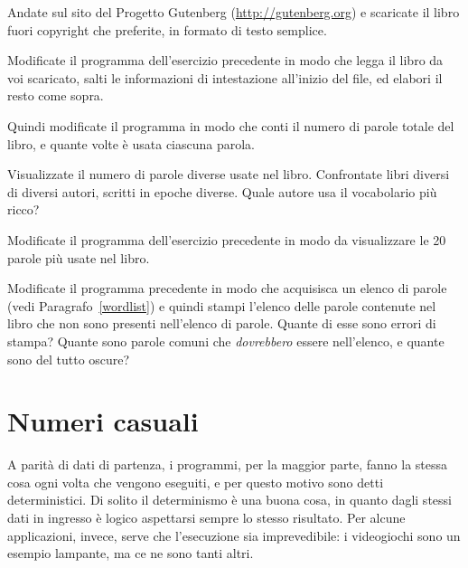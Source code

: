 \documentclass[10pt]{book}
\begin{document}
\vspace{0.2in}
\begin{exercise}

Andate sul sito del Progetto Gutenberg (\url{http://gutenberg.org}) e scaricate il libro fuori copyright che preferite, in formato di testo semplice.

Modificate il programma dell'esercizio precedente in modo che legga il libro da voi scaricato, salti le informazioni di intestazione all'inizio del file, ed elabori il resto come sopra.

Quindi modificate il programma in modo che conti il numero di parole totale del libro, e quante volte è usata ciascuna parola.

Visualizzate il numero di parole diverse usate nel libro. Confrontate libri diversi di diversi autori, scritti in epoche diverse. Quale autore usa il vocabolario più ricco?
\end{exercise}

\vspace{0.2in}
\begin{exercise}

Modificate il programma dell'esercizio precedente in modo da visualizzare le 20 parole più usate nel libro.

\end{exercise}

\vspace{0.2in}
\begin{exercise}

Modificate il programma precedente in modo che acquisisca un elenco di parole (vedi Paragrafo~\ref{wordlist}) e quindi stampi l'elenco delle parole contenute nel libro che non sono presenti nell'elenco di parole. Quante di esse sono errori di stampa? Quante sono parole comuni che {\em dovrebbero} essere nell'elenco, e quante sono del tutto oscure?

\end{exercise}


\section{Numeri casuali}

A parità di dati di partenza, i programmi, per la maggior parte, fanno la stessa cosa ogni volta che vengono eseguiti, e per questo motivo sono detti  deterministici. Di solito il determinismo è una buona cosa, in quanto dagli stessi dati in ingresso è logico aspettarsi sempre lo stesso risultato. Per alcune applicazioni, invece, serve che l'esecuzione sia imprevedibile: i videogiochi sono un esempio lampante, ma ce ne sono tanti altri.
\end{document}

